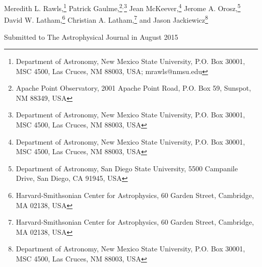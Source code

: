 
Meredith L. Rawls,\footnote{Department of Astronomy, New Mexico State University, P.O. Box 30001, MSC 4500, Las Cruces, NM 88003, USA; mrawls@nmsu.edu}
\setcounter{footnote}{1}
Patrick Gaulme,\footnote{Apache Point Observatory, 2001 Apache Point Road, P.O. Box 59, Sunspot, NM 88349, USA}\setcounter{footnote}{0}$^{,}$\footnote{Department of Astronomy, New Mexico State University, P.O. Box 30001, MSC 4500, Las Cruces, NM 88003, USA}
\setcounter{footnote}{0}
Jean McKeever,\footnote{Department of Astronomy, New Mexico State University, P.O. Box 30001, MSC 4500, Las Cruces, NM 88003, USA}
\setcounter{footnote}{2}
Jerome A. Orosz,\footnote{Department of Astronomy, San Diego State University, 5500 Campanile Drive, San Diego, CA 91945, USA}
David W. Latham,\footnote{Harvard-Smithsonian Center for Astrophysics, 60 Garden Street, Cambridge, MA 02138, USA}
\setcounter{footnote}{3}
Christian A. Latham,\footnote{Harvard-Smithsonian Center for Astrophysics, 60 Garden Street, Cambridge, MA 02138, USA} and 
\setcounter{footnote}{0}
Jason Jackiewicz\footnote{Department of Astronomy, New Mexico State University, P.O. Box 30001, MSC 4500, Las Cruces, NM 88003, USA}

Submitted to The Astrophysical Journal in August 2015

  
  
